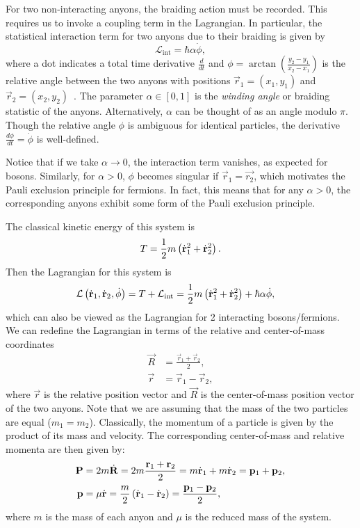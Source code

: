 For two non-interacting anyons, the braiding action must be recorded. This requires us to invoke a coupling term in the Lagrangian. In particular, the statistical interaction term for two anyons due to their braiding is given by
\begin{equation}
    \mathcal{L}_{\text{int}} = \hbar\alpha\dot{\phi},
\end{equation}
where a dot indicates a total time derivative $\frac{d}{dt}$ and $\phi = \arctan\left( \frac{y_2-y_1}{x_2-x_1} \right)$ is the relative angle between the two anyons with positions $\vec{r}_1=(x_1,y_1)$ and $\vec{r}_2=(x_2,y_2)$~\cite{Khare2005,Wilczek1982}. The parameter $\alpha\in\left[ 0,1 \right]$ is the \textit{winding angle} or braiding statistic of the anyons. Alternatively, $\alpha$ can be thought of as an angle modulo $\pi$. Though the relative angle $\phi$ is ambiguous for identical particles, the derivative $\frac{d\phi}{dt}=\dot{\phi}$ is well-defined.

Notice that if we take $\alpha\to 0$, the interaction term vanishes, as expected for bosons. Similarly, for $\alpha>0$, $\phi$ becomes singular if $\vec{r}_1 = \vec{r_2}$, which motivates the Pauli exclusion principle for fermions. In fact, this means that for any $\alpha>0$, the corresponding anyons exhibit some form of the Pauli exclusion principle.

The classical kinetic energy of this system is
\begin{equation}
    T = \frac{1}{2}m\left( {\dot{\mathbf{r}}_1}^2 + {\dot{\mathbf{r}}_2}^2 \right).
\end{equation}
Then the Lagrangian for this system is
\begin{align}
    \mathcal{L}\left( \dot{\mathbf{r}}_1,\dot{\mathbf{r}}_2, \dot{\phi} \right) &= T + \mathcal{L}_{\text{int}} = \frac{1}{2}m\left( {\dot{\mathbf{r}}_1}^2 + {\dot{\mathbf{r}}_2}^2 \right) + \hbar\alpha\dot{\phi},
\end{align}
which can also be viewed as the Lagrangian for 2 interacting bosons/fermions. We can redefine the Lagrangian in terms of the relative and center-of-mass coordinates
\begin{align}
    \vec{R} &= \frac{\vec{r}_1+\vec{r}_2}{2}, \\
    \vec{r} &= \vec{r}_1-\vec{r}_2,
\end{align}
where $\vec{r}$ is the relative position vector and $\vec{R}$ is the center-of-mass position vector of the two anyons. Note that we are assuming that the mass of the two particles are equal ($m_1=m_2$). Classically, the momentum of a particle is given by the product of its mass and velocity. The corresponding center-of-mass and relative momenta are then given by:
\begin{align}
    \mathbf{P} &= 2m\dot{\mathbf{R}} = 2m \frac{\mathbf{r}_1+\mathbf{r}_2}{2} = m\dot{\mathbf{r}}_1 + m\dot{\mathbf{r}}_2 = \mathbf{p}_1 + \mathbf{p}_2, \\
    \mathbf{p} &= \mu\dot{\mathbf{r}} = \frac{m}{2}\left( \dot{\mathbf{r}}_1-\dot{\mathbf{r}}_2 \right) = \frac{\mathbf{p}_1 - \mathbf{p}_2}{2},
\end{align}
where $m$ is the mass of each anyon and $\mu$ is the reduced mass of the system.

